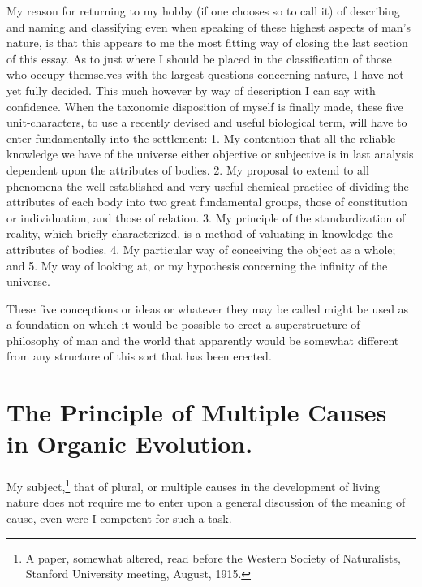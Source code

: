 \documentclass[a4paper, 11pt, oneside, polutonikogreek, english]{article}
\begin{document}
My reason for returning to my hobby (if one chooses so to call it) of describing and naming and classifying even when speaking of these highest aspects of man's nature, is that this appears to me the most fitting way of closing the last section of this essay. As to just where I should be placed in the classification of those who occupy themselves with the largest questions concerning nature, I have not yet fully decided. This much however by way of description I can say with confidence. When the taxonomic disposition of myself is finally made, these five unit-characters, to use a recently devised and useful biological term, will have to enter fundamentally into the settlement: 1. My contention that all the reliable knowledge we have of the universe either objective or subjective is in last analysis dependent upon the attributes of bodies. 2. My proposal to extend to all phenomena the well-established and very useful chemical practice of dividing the attributes of each body into two great fundamental groups, those of constitution or individuation, and those of relation. 3. My principle of the standardization of reality, which briefly characterized, is a method of valuating in knowledge the attributes of bodies. 4. My particular way of conceiving the object as a whole; and 5. My way of looking at, or my hypothesis concerning the infinity of the universe.

These five conceptions or ideas or whatever they may be called might be used as a foundation on which it would be possible to erect a superstructure of philosophy of man and the world that apparently would be somewhat different from any structure of this sort that has been erected.
\clearpage
\section{The Principle of Multiple Causes in Organic Evolution.}
\paragraph{}
My subject,\footnote{A paper, somewhat altered, read before the Western Society of Naturalists, Stanford University meeting, August, 1915.} that of plural, or multiple causes in the development of living nature does not require me to enter upon a general discussion of the meaning of cause, even were I competent for such a task.
\end{document}
